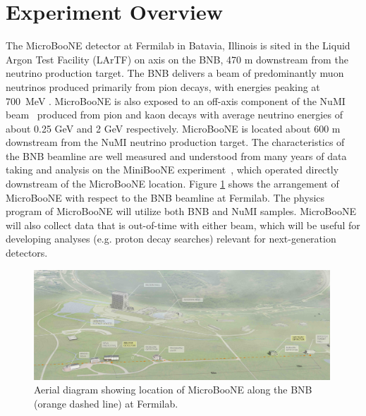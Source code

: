\section{Experiment Overview}
\label{sec:overview}

The MicroBooNE detector at Fermilab in Batavia, Illinois is sited in the Liquid Argon Test Facility (LArTF) on axis on the BNB, 470 m downstream from the neutrino production target.   The BNB delivers a beam of predominantly muon neutrinos produced primarily from pion decays, with energies peaking at 700~MeV \cite{AguilarArevalo:2008yp}. MicroBooNE is also exposed to an off-axis component of the NuMI beam~\cite{Adamson:2015dkw} produced from pion and kaon decays with average neutrino energies of about 0.25 GeV and 2 GeV respectively.   MicroBooNE is located about 600 m downstream from the NuMI neutrino production target.  The characteristics of the BNB beamline are well measured and understood from many years of data taking and analysis on the MiniBooNE experiment~\cite{AguilarArevalo:2008-MBflux}, which operated directly downstream of the MicroBooNE location.  Figure \ref{fnalmap} shows the arrangement of MicroBooNE with respect to the BNB beamline at Fermilab.  The physics program of MicroBooNE will utilize both BNB and NuMI samples.  MicroBooNE will also collect data that is out-of-time with either beam, which will be useful for developing analyses (e.g. proton decay searches) relevant for next-generation detectors.  


\begin{figure}
\centering 
\includegraphics[width=0.99\textwidth]{figures/aerial_diagram.jpg}
\caption{Aerial diagram showing location of MicroBooNE along the BNB (orange dashed line) at Fermilab.}
\label{fnalmap}
\end{figure}



